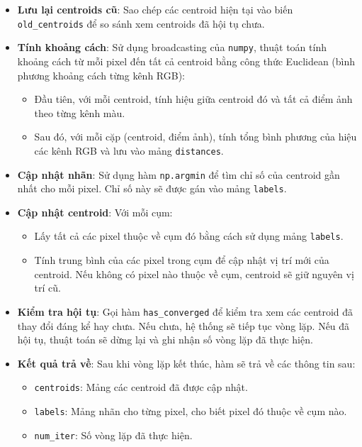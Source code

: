 \begin{itemize}
	\item \textbf{Lưu lại centroids cũ}: Sao chép các centroid hiện tại vào biến \texttt{old\_centroids} để so sánh xem centroids đã hội tụ chưa.
	\item \textbf{Tính khoảng cách}: Sử dụng broadcasting của \texttt{numpy}, thuật toán tính khoảng cách từ mỗi pixel đến tất cả centroid bằng công thức Euclidean (bình phương khoảng cách từng kênh RGB):
	      \begin{itemize}
		      \item Đầu tiên, với mỗi centroid, tính hiệu giữa centroid đó và tất cả điểm ảnh theo từng kênh màu.
		      \item Sau đó, với mỗi cặp (centroid, điểm ảnh), tính tổng bình phương của hiệu các kênh RGB và lưu vào mảng \texttt{distances}.
	      \end{itemize}

	\item \textbf{Cập nhật nhãn}: Sử dụng hàm \texttt{np.argmin} để tìm chỉ số của centroid gần nhất cho mỗi pixel. Chỉ số này sẽ được gán vào mảng \texttt{labels}.

	\item \textbf{Cập nhật centroid}: Với mỗi cụm:
	      \begin{itemize}
		      \item Lấy tất cả các pixel thuộc về cụm đó bằng cách sử dụng mảng \texttt{labels}.
		      \item Tính trung bình của các pixel trong cụm để cập nhật vị trí mới của centroid. Nếu không có pixel nào thuộc về cụm, centroid sẽ giữ nguyên vị trí cũ.
	      \end{itemize}

	\item \textbf{Kiểm tra hội tụ}: Gọi hàm \texttt{has\_converged} để kiểm tra xem các centroid đã thay đổi đáng kể hay chưa. Nếu chưa, hệ thống sẽ tiếp tục vòng lặp. Nếu đã hội tụ, thuật toán sẽ dừng lại và ghi nhận số vòng lặp đã thực hiện.
	\item \textbf{Kết quả trả về}: Sau khi vòng lặp kết thúc, hàm sẽ trả về các thông tin sau:
	      \begin{itemize}
		      \item \texttt{centroids}: Mảng các centroid đã được cập nhật.
		      \item \texttt{labels}: Mảng nhãn cho từng pixel, cho biết pixel đó thuộc về cụm nào.
		      \item \texttt{num\_iter}: Số vòng lặp đã thực hiện.
	      \end{itemize}

\end{itemize}





